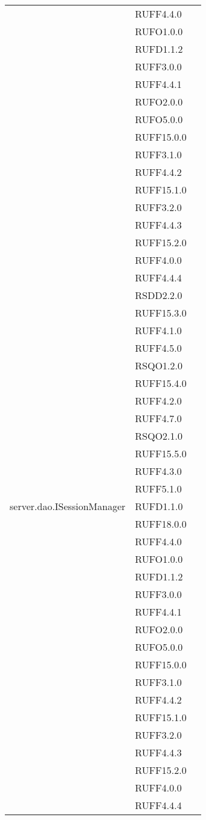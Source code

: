 \begin{center}
\begin{longtable}{lp{}l}
 & RUFF4.4.0 \\
 & RUFO1.0.0 \\
 & RUFD1.1.2 \\
 & RUFF3.0.0 \\
 & RUFF4.4.1 \\
 & RUFO2.0.0 \\
 & RUFO5.0.0 \\
 & RUFF15.0.0 \\
 & RUFF3.1.0 \\
 & RUFF4.4.2 \\
 & RUFF15.1.0 \\
 & RUFF3.2.0 \\
 & RUFF4.4.3 \\
 & RUFF15.2.0 \\
 & RUFF4.0.0 \\
 & RUFF4.4.4 \\
 & RSDD2.2.0 \\
 & RUFF15.3.0 \\
 & RUFF4.1.0 \\
 & RUFF4.5.0 \\
 & RSQO1.2.0 \\
 & RUFF15.4.0 \\
 & RUFF4.2.0 \\
 & RUFF4.7.0 \\
 & RSQO2.1.0 \\
 & RUFF15.5.0 \\
 & RUFF4.3.0 \\
 & RUFF5.1.0 \\
server.dao.ISessionManager & RUFD1.1.0 \\
 & RUFF18.0.0 \\
 & RUFF4.4.0 \\
 & RUFO1.0.0 \\
 & RUFD1.1.2 \\
 & RUFF3.0.0 \\
 & RUFF4.4.1 \\
 & RUFO2.0.0 \\
 & RUFO5.0.0 \\
 & RUFF15.0.0 \\
 & RUFF3.1.0 \\
 & RUFF4.4.2 \\
 & RUFF15.1.0 \\
 & RUFF3.2.0 \\
 & RUFF4.4.3 \\
 & RUFF15.2.0 \\
 & RUFF4.0.0 \\
 & RUFF4.4.4 \\

\end{longtable}
\end{center}
